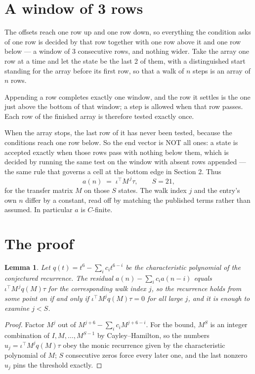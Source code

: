 \documentclass[11pt,a4paper]{article}
\theoremstyle{plain}
\newtheorem{lemma}[theorem]{Lemma}
\theoremstyle{definition}
\begin{document}
\section{A window of 3 rows}

The offsets reach one row up and one row down, so everything the condition asks of one row is
decided by that row together with one row above it and one row below --- a window of
$3$ consecutive rows, and nothing wider. Take the array one row at a time
and let the state be the last 2 of them, with a distinguished start standing for the
array before its first row, so that a walk of $n$ steps is an array of $n$ rows.

Appending a row completes exactly one window, and the row it settles is the one just above the bottom of that window; a step is
allowed when that row passes. Each row of the finished
array is therefore tested exactly once.

When the array stops, the last row of it has never been tested, because the
conditions reach one row below. So the end vector is NOT all ones: a state is accepted exactly when
those rows pass with nothing below them, which is decided by running the same test on the window
with absent rows appended --- the same rule that governs a cell at the bottom edge in
Section 2.
Thus
\[
a(n)\;=\;\iota^{\!\top}M^{\,j}\tau ,\qquad S=21,
\]
for the transfer matrix $M$ on those $S$ states. The walk index $j$ and the entry's own $n$
differ by a constant, read off by matching the published terms rather than assumed. In
particular $a$ is $C$-finite.

\section{The proof}

\begin{lemma}\label{lem:crit}
Let $q(t)=t^{6}-\sum_i c_it^{6-i}$ be the characteristic polynomial of the
conjectured recurrence. The residual $a(n)-\sum_ic_ia(n-i)$ equals
$\iota^{\!\top}M^{\,j}q(M)\tau$ for the corresponding walk index $j$, so the recurrence
holds from some point on if and only if $\iota^{\!\top}M^{j}q(M)\tau=0$ for all large $j$,
and it is enough to examine $j<S$.
\end{lemma}

\begin{proof}
Factor $M^{j}$ out of $M^{j+6}-\sum_ic_iM^{j+6-i}$. For the bound, $M^{S}$
is an integer combination of $I,M,\dots,M^{S-1}$ by Cayley--Hamilton, so the numbers
$u_j=\iota^{\!\top}M^{j}q(M)\tau$ obey the monic recurrence given by the characteristic
polynomial of $M$; $S$ consecutive zeros force every later one, and the last nonzero $u_j$
pins the threshold exactly.
\end{proof}
\end{document}
